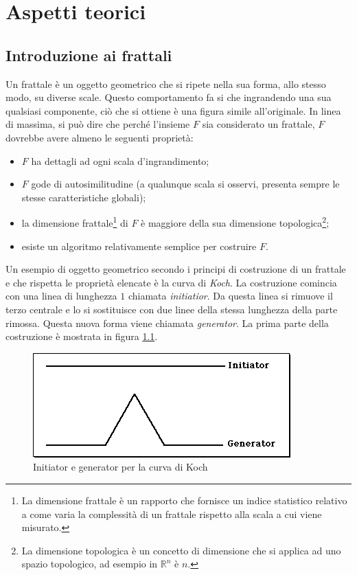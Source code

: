 \documentclass[11pt,a4paper,appendixprefix=true,numbers=noenddot]{scrreprt}
\begin{document}
\chapter{Aspetti teorici}

\section{Introduzione ai frattali}

Un frattale è un oggetto geometrico che si ripete nella sua forma, allo stesso modo, su diverse scale. Questo comportamento fa si che ingrandendo una sua qualsiasi componente, ciò che si ottiene è una figura simile all'originale. In linea di massima, si può dire che perché l'insieme $F$ sia considerato un frattale, $F$ dovrebbe avere almeno le seguenti proprietà:

\begin{itemize}
\item $F$ ha dettagli ad ogni scala d'ingrandimento;
\item $F$ gode di autosimilitudine (a qualunque scala si osservi, presenta sempre le stesse caratteristiche globali);
\item la dimensione frattale\footnote{La dimensione frattale è un rapporto che fornisce un indice statistico relativo a come varia la complessità di un frattale rispetto alla scala a cui viene misurato.} di $F$ è maggiore della sua dimensione topologica\footnote{La dimensione topologica è un concetto di dimensione che si applica ad uno spazio topologico, ad esempio in $\mathbb{R}^n$ è $n$.};
\item esiste un algoritmo relativamente semplice per costruire $F$.
\end{itemize}

Un esempio di oggetto geometrico secondo i principi di costruzione di un frattale e che rispetta le proprietà elencate è la curva di \textit{Koch}. La costruzione comincia con una linea di lunghezza $1$ chiamata \textit{initiatior}. Da questa linea si rimuove il terzo centrale e lo si sostituisce con due linee della stessa lunghezza della parte rimossa. Questa nuova forma viene chiamata \textit{generator}. La prima parte della costruzione è mostrata in figura \ref{fig:k1}.

\begin{figure}[!ht]
\centering
\includegraphics[scale=0.55]{images/koch1.png}
\caption{Initiator e generator per la curva di Koch}
\label{fig:k1}
\end{figure}
\end{document}
